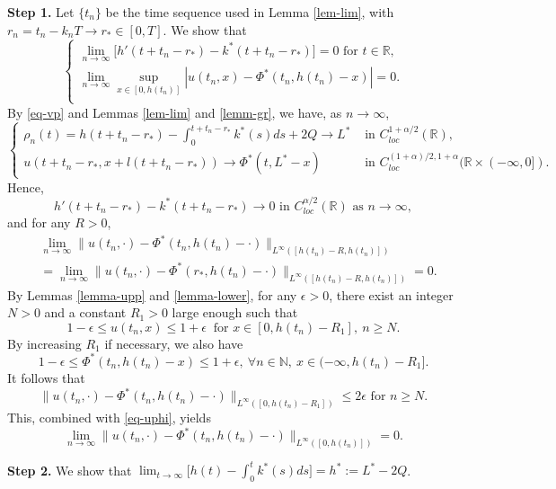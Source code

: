 \documentclass[11pt]{amsart}
\numberwithin{equation}{section}
\begin{document}
\textbf{Step 1.} Let $\{t_n\}$ be the time sequence used  in Lemma \ref{lem-lim}, with $r_n=t_n-k_nT\to r_*\in [0,T]$. We show that
\begin{equation*}
  \begin{cases}
  \lim_{n\to\infty}\big[h'(t+t_n-r_*)-k^*(t+t_n-r_*)\big]=0  \text{ for }t\in\mathbb R, \\
  \lim_{n\to\infty}\sup_{x\in[0,h(t_n)]}|u(t_n,x)-\Phi^*(t_n,h(t_n)-x)|=0.\\
  \end{cases}
\end{equation*}
By \eqref{eq-vp} and Lemmas \ref{lem-lim} and \ref{lemm-gr}, we have,  as $n\to\infty$,
\[\begin{cases}\rho_n(t)=h(t+t_n-r_*)-\int_0^{t+t_n-r_*}k^*(s)ds+2Q\to L^*& \text{ in } C_{loc}^{1+\alpha/2}(\mathbb R),\\
u(t+t_n-r_*,x+l(t+t_n-r_*))\to \Phi^*(t,L^*-x) &\text{ in } C_{loc}^{(1+\alpha)/2,1+\alpha}(\mathbb{R}\times(-\infty,0]).
\end{cases}\]
Hence,  
\[h'(t+t_n-r_*)-k^*(t+t_n-r_*)\to 0 \text{ in } C_{loc}^{\alpha/2}(\mathbb R) \text{ as }n\to\infty,\]
and for any $R>0$,
\begin{equation}\label{eq-uphi}
\begin{aligned}
  &\lim_{n\to\infty}\|u(t_n,\cdot)-\Phi^*(t_n,h(t_n)-\cdot)\|_{L^\infty( [h(t_n)-R,h(t_n)])}\\
  &=\lim_{n\to\infty}\|u(t_n,\cdot)-\Phi^*(r_*,h(t_n)-\cdot)\|_{L^\infty( [h(t_n)-R,h(t_n)])}=0.
  \end{aligned}
\end{equation}
 By  Lemmas \ref{lemma-upp} and \ref{lemma-lower},  for any $\epsilon>0$,  there exist  an integer $N>0$ and a constant  $R_1>0$ large enough such that 
\[1-\epsilon\leq  u(t_n,x)\leq 1+\epsilon ~\text{ for }x\in[0,h(t_n)-R_1],\ n\geq N.\]
By increasing $R_1$ if necessary, we also have
\[1-\epsilon\leq \Phi^*(t_n, h(t_n)-x)\leq 1+\epsilon,~ \forall n\in\mathbb N,\ x\in(-\infty,h(t_n)-R_1].\]
It follows that 
\[ \|u(t_n,\cdot)- \Phi^*(t_n, h(t_n)-\cdot)\|_{L^\infty([0,h(t_n)-R_1])}\leq 2\epsilon \mbox{  for $n\geq N$}.\]
 This, combined with \eqref{eq-uphi}, yields
\begin{equation}\label{eq-limup}
  \lim_{n\to\infty}\|u(t_n,\cdot)- \Phi^*(t_n, h(t_n)-\cdot)\|_{L^\infty([0,h(t_n)])}=0.
\end{equation}


 \textbf{Step 2.} We show that $\displaystyle\lim_{t\to\infty}\Big[h(t)-\int_0^tk^*(s)ds\Big]=h^*:=L^*-2Q$.
\end{document}
